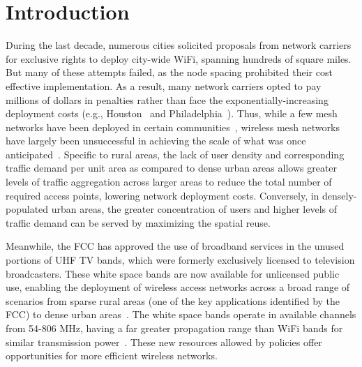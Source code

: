 \section{Introduction}
\label{sec:introduction}



During the last decade, numerous cities solicited proposals from network carriers for 
exclusive rights to deploy city-wide WiFi, spanning hundreds of square miles. But many 
of these attempts failed, as the node spacing prohibited their cost effective implementation. 
As a result, many network carriers opted to pay millions 
of dollars in penalties rather than face the exponentially-increasing deployment costs 
(e.g., Houston~\cite{cnet_aug07} and Philadelphia~\cite{arstechnica_may08}). 
Thus, while a few mesh networks have been deployed in certain communities~\cite{CRSK06},
wireless mesh networks have largely been unsuccessful in achieving the scale of what was 
once anticipated~\cite{taps}. Specific to rural areas, the lack of user density and 
corresponding traffic demand per unit area as compared to dense urban areas allows greater 
levels of traffic aggregation across larger areas to reduce the total number of required access points, lowering
network deployment costs. Conversely, in densely-populated urban areas, the greater concentration of users 
and higher levels of traffic demand can be served by maximizing the spatial reuse. 

Meanwhile, the FCC has approved the use of broadband services in the unused portions of 
UHF TV bands, which were formerly exclusively licensed to television broadcasters. 
These white space bands are now available for unlicensed public use, enabling the deployment 
of wireless access networks across a broad range of scenarios from sparse rural areas 
(one of the key applications identified by the FCC) to dense urban areas~\cite{carlson}. 
The white space bands operate in available channels from 54-806 MHz, having a far greater 
propagation range than WiFi bands for similar transmission power~\cite{balanis2012antenna}.
These new resources allowed by policies offer opportunities for more efficient wireless networks. 


